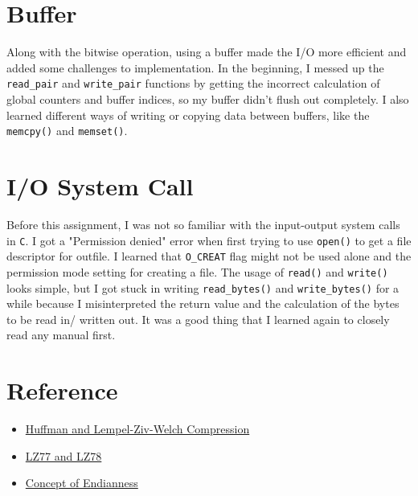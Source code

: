 \documentclass[12pt]{article}
\begin{document}
\section{Buffer}

Along with the bitwise operation, using a buffer made the I/O more efficient and added some challenges to implementation. In the beginning, I messed up the \texttt{read\_pair} and \texttt{write\_pair} functions by getting the incorrect calculation of global counters and buffer indices, so my buffer didn't flush out completely. I also learned different ways of writing or copying data between buffers, like the \texttt{memcpy()} and \texttt{memset()}.

\section{I/O System Call}

Before this assignment, I was not so familiar with the input-output system calls in \texttt{C}. I got a "Permission denied" error when first trying to use \texttt{open()} to get a file descriptor for outfile. I learned that \texttt{O\_CREAT} flag might not be used alone and the permission mode setting for creating a file. The usage of \texttt{read()} and \texttt{write()} looks simple, but I got stuck in writing \texttt{read\_bytes()} and \texttt{write\_bytes()} for a while because I misinterpreted the return value and the calculation of the bytes to be read in/ written out. It was a good thing that I learned again to closely read any manual first.

\section{Reference}
\begin{itemize}
    \item \href{https://web.mit.edu/6.02/www/f2011/handouts/3.pdf}{Huffman and Lempel-Ziv-Welch Compression}
    \item \href{https://www.ijesit.com/Volume%204/Issue%203/IJESIT201503_06.pdf}{LZ77 and LZ78}
    \item \href{https://www.freecodecamp.org/news/what-is-endianness-big-endian-vs-little-endian/}{Concept of Endianness}
\end{itemize}
\end{document}
